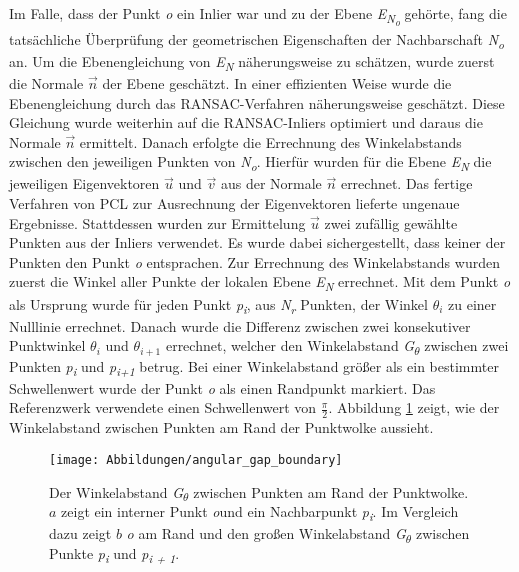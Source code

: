 Im Falle, dass der Punkt \textit{o} ein Inlier war und zu der Ebene \textit{E\textsubscript{N\textsubscript{o}}} gehörte, fang die tatsächliche Überprüfung der geometrischen Eigenschaften der Nachbarschaft \textit{N\textsubscript{o}} an. Um die Ebenengleichung von \textit{E\textsubscript{N}} näherungsweise zu schätzen, wurde zuerst die Normale \textit{$\vec{n}$} der Ebene geschätzt. In einer effizienten Weise wurde die Ebenengleichung durch das RANSAC-Verfahren näherungsweise geschätzt. Diese Gleichung wurde weiterhin auf die RANSAC-Inliers optimiert und daraus die Normale \textit{$\vec{n}$} ermittelt. Danach erfolgte die Errechnung des Winkelabstands zwischen den jeweiligen Punkten von \textit{N\textsubscript{o}}. Hierfür wurden für die Ebene \textit{E\textsubscript{N}} die jeweiligen Eigenvektoren $\vec{u}$ und $\vec{v}$ aus der Normale $\vec{n}$ errechnet. Das fertige Verfahren von PCL zur Ausrechnung der Eigenvektoren lieferte ungenaue Ergebnisse. Stattdessen wurden zur Ermittelung \textit{$\vec{u}$} zwei zufällig gewählte Punkten aus der Inliers verwendet. Es wurde dabei sichergestellt, dass keiner der Punkten den Punkt \textit{o} entsprachen. Zur Errechnung des Winkelabstands wurden zuerst die Winkel aller Punkte der lokalen Ebene \textit{E\textsubscript{N}} errechnet. Mit dem Punkt \textit{o} als Ursprung wurde für jeden Punkt \textit{p\textsubscript{i}}, aus \textit{N\textsubscript{r}} Punkten, der Winkel \textit{$\theta_i$} zu einer Nulllinie errechnet. Danach wurde die Differenz zwischen zwei konsekutiver Punktwinkel $\theta_i$ und $\theta_{i+1}$ errechnet, welcher den Winkelabstand \textit{G\textsubscript{$\theta$}} zwischen zwei Punkten \textit{p\textsubscript{i}} und \textit{p\textsubscript{i+1}} betrug. Bei einer Winkelabstand größer als ein bestimmter Schwellenwert wurde der Punkt \textit{o} als einen Randpunkt markiert. Das Referenzwerk verwendete einen Schwellenwert von $\frac{\pi}{2}$. Abbildung \ref{edge_boundary} zeigt, wie der Winkelabstand zwischen Punkten am Rand der Punktwolke aussieht.

\begin{figure}[h]
	\texttt{[image: Abbildungen/angular\_gap\_boundary]}
	\centering
	\caption{Der Winkelabstand \textit{G\textsubscript{$\theta$}} zwischen Punkten am Rand der Punktwolke. \textbf{\(a\)} zeigt ein interner Punkt \textit{o}und ein Nachbarpunkt \textit{p\textsubscript{i}}. Im Vergleich dazu zeigt \textbf{\(b\)} \textit{o} am Rand und den großen Winkelabstand \textit{G\textsubscript{$\theta$}} zwischen Punkte \textit{p\textsubscript{i}} und \textit{p\textsubscript{i + 1}}. \autocite{ni_edge_2016}}
	\label{edge_boundary}
\end{figure}

